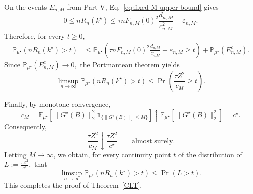 \documentclass[11pt]{article}
\theoremstyle{definition}
\newcommand{\E}{\mathbb{E}}
\begin{document}
On the events $E_{n,M}$ from Part V,
Eq.~\eqref{eq:fixed-M-upper-bound} gives
\[
0
\leq
nR_n(k^\star)
\leq
\tau nF_{n,M}(0)^2
\frac{d_{n,M}}{c_{n,M}^2}
+
\varepsilon_{n,M}.
\]
Therefore, for every $t\geq0$,
\[
\begin{aligned}
\mathbb P_{\mu^\star}
\left(
nR_n(k^\star)>t
\right)
&\leq
\mathbb P_{\mu^\star}
\left(
\tau nF_{n,M}(0)^2
\frac{d_{n,M}}{c_{n,M}^2}
+
\varepsilon_{n,M}
\geq t
\right)
+
\mathbb P_{\mu^\star}(E_{n,M}^c).
\end{aligned}
\]
Since $\mathbb P_{\mu^\star}(E_{n,M}^c)\longrightarrow0,$
the Portmanteau theorem yields
\[
\limsup_{n\to\infty}
\mathbb P_{\mu^\star}
\left(
nR_n(k^\star)>t
\right)
\leq
\Pr\!\left(
\frac{\tau Z^2}{c_M}
\geq t
\right).
\]

Finally, by monotone convergence,
\[
c_M
=
\E_{\mu^\star}
\left[
\|G^\star(B)\|_2^2
\mathbf 1_{\{\|G^\star(B)\|_2\leq M\}}
\right]
\uparrow
\E_{\mu^\star}
\left[
\|G^\star(B)\|_2^2
\right]
=
c^\star.
\]
Consequently,
\[
\frac{\tau Z^2}{c_M}
\downarrow
\frac{\tau Z^2}{c^\star}
\qquad
\text{almost surely}.
\]
Letting $M\to\infty$, we obtain, for every continuity point $t$ of
the distribution of $L
:=
\frac{\tau Z^2}{c^\star},$
that
\[
\limsup_{n\to\infty}
\mathbb P_{\mu^\star}
\left(
nR_n(k^\star)>t
\right)
\leq
\Pr(L>t).
\]
This completes the proof of Theorem~\ref{CLT}.
\end{document}
